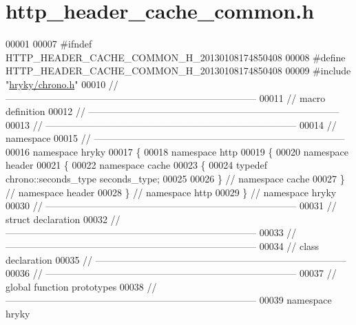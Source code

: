 \hypertarget{http__header__cache__common_8h_source}{\section{http\-\_\-header\-\_\-cache\-\_\-common.\-h}
}

\begin{DoxyCode}
00001 
00007 \textcolor{preprocessor}{#ifndef HTTP\_HEADER\_CACHE\_COMMON\_H\_20130108174850408}
00008 \textcolor{preprocessor}{}\textcolor{preprocessor}{#define HTTP\_HEADER\_CACHE\_COMMON\_H\_20130108174850408}
00009 \textcolor{preprocessor}{}\textcolor{preprocessor}{#include "\hyperlink{chrono_8h}{hryky/chrono.h}"}
00010 \textcolor{comment}{//
      ------------------------------------------------------------------------------}
00011 \textcolor{comment}{// macro definition}
00012 \textcolor{comment}{//
      ------------------------------------------------------------------------------}
00013 \textcolor{comment}{//
      ------------------------------------------------------------------------------}
00014 \textcolor{comment}{// namespace}
00015 \textcolor{comment}{//
      ------------------------------------------------------------------------------}
00016 \textcolor{keyword}{namespace }hryky
00017 \{
00018 \textcolor{keyword}{namespace }http
00019 \{
00020 \textcolor{keyword}{namespace }header
00021 \{
00022 \textcolor{keyword}{namespace }cache
00023 \{
00024     \textcolor{keyword}{typedef} chrono::seconds\_type seconds\_type;
00025     
00026 \} \textcolor{comment}{// namespace cache}
00027 \} \textcolor{comment}{// namespace header}
00028 \} \textcolor{comment}{// namespace http}
00029 \} \textcolor{comment}{// namespace hryky}
00030 \textcolor{comment}{//
      ------------------------------------------------------------------------------}
00031 \textcolor{comment}{// struct declaration}
00032 \textcolor{comment}{//
      ------------------------------------------------------------------------------}
00033 \textcolor{comment}{//
      ------------------------------------------------------------------------------}
00034 \textcolor{comment}{// class declaration}
00035 \textcolor{comment}{//
      ------------------------------------------------------------------------------}
00036 \textcolor{comment}{//
      ------------------------------------------------------------------------------}
00037 \textcolor{comment}{// global function prototypes}
00038 \textcolor{comment}{//
      ------------------------------------------------------------------------------}
00039 \textcolor{keyword}{namespace }hryky

\end{DoxyCode}
